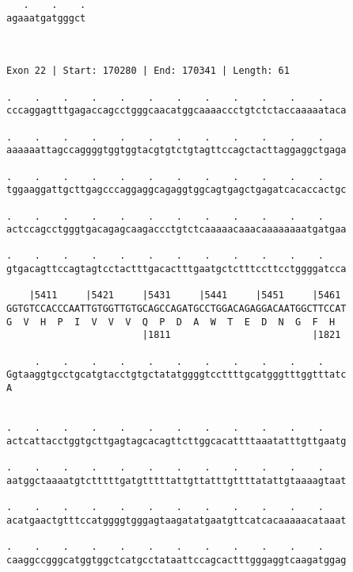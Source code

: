 \documentclass{article}
\begin{document}
\begin{Verbatim}
   .    .    .
agaaatgatgggct
              
              
 
Exon 22 | Start: 170280 | End: 170341 | Length: 61
 
.    .    .    .    .    .    .    .    .    .    .    .    
cccaggagtttgagaccagcctgggcaacatggcaaaaccctgtctctaccaaaaataca
                                                            
.    .    .    .    .    .    .    .    .    .    .    .    
aaaaaattagccaggggtggtggtacgtgtctgtagttccagctacttaggaggctgaga
                                                            
.    .    .    .    .    .    .    .    .    .    .    .    
tggaaggattgcttgagcccaggaggcagaggtggcagtgagctgagatcacaccactgc
                                                            
.    .    .    .    .    .    .    .    .    .    .    .    
actccagcctgggtgacagagcaagaccctgtctcaaaaacaaacaaaaaaaatgatgaa
                                                            
.    .    .    .    .    .    .    .    .    .    .    .    
gtgacagttccagtagtcctactttgacactttgaatgctctttccttcctggggatcca
                                                            
    |5411     |5421     |5431     |5441     |5451     |5461 
GGTGTCCACCCAATTGTGGTTGTGCAGCCAGATGCCTGGACAGAGGACAATGGCTTCCAT
G  V  H  P  I  V  V  V  Q  P  D  A  W  T  E  D  N  G  F  H  
                        |1811                         |1821 
  
     .    .    .    .    .    .    .    .    .    .    .    
Ggtaaggtgcctgcatgtacctgtgctatatggggtccttttgcatgggtttggtttatc
A                                                           
                                                            
  
.    .    .    .    .    .    .    .    .    .    .    .    
actcattacctggtgcttgagtagcacagttcttggcacattttaaatatttgttgaatg
                                                            
.    .    .    .    .    .    .    .    .    .    .    .    
aatggctaaaatgtctttttgatgtttttattgttatttgttttatattgtaaaagtaat
                                                            
.    .    .    .    .    .    .    .    .    .    .    .    
acatgaactgtttccatggggtgggagtaagatatgaatgttcatcacaaaaacataaat
                                                            
.    .    .    .    .    .    .    .    .    .    .    .    
caaggccgggcatggtggctcatgcctataattccagcactttgggaggtcaagatggag
                                                            

\end{Verbatim}
\end{document}
